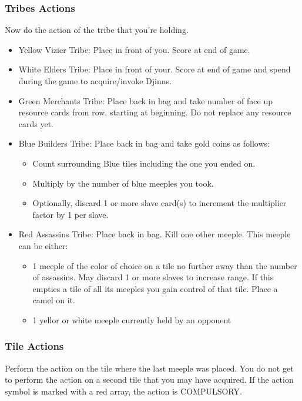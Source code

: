 \documentclass[12pt]{article}
\newenvironment{itemizeCustom}
{\begin{itemize}
  \setlength{\itemsep}{1pt}
  \setlength{\parskip}{0pt}
  \setlength{\parsep}{0pt}}
{\end{itemize}}
\begin{document}
\begin{multicols*}{2}
\subsubsection*{Tribes Actions}
Now do the action of the tribe that you're holding.
\begin{itemizeCustom}
    \item Yellow Vizier Tribe: Place in front of you. Score at end of game.
    \item White Elders Tribe: Place in front of your. Score at end of game and spend during the game to acquire/invoke Djinns.
    \item Green Merchants Tribe: Place back in bag and take number of face up resource cards from row, starting at beginning. Do not replace any resource cards yet.
    \item Blue Builders Tribe: Place back in bag and take gold coins as follows:
        \begin{itemizeCustom}
            \item Count surrounding Blue tiles including the one you ended on.
            \item Multiply by the number of blue meeples you took.
            \item Optionally, discard 1 or more slave card(s) to increment the multiplier factor by 1 per slave.
        \end{itemizeCustom}
    \item Red Assassins Tribe: Place back in bag. Kill one other meeple. This meeple can be either:
        \begin{itemizeCustom}
            \item 1 meeple of the color of choice on a tile no further away than the number of assassins. May discard 1 or more slaves to increase range. If this empties a tile of all its meeples you gain control of that tile. Place a camel on it.
            \item 1 yellor or white meeple currently held by an opponent
        \end{itemizeCustom}
\end{itemizeCustom}

\subsubsection*{Tile Actions}
Perform the action on the tile where the last meeple was placed. You do not get to perform the action on a second tile that you may have acquired. If the action symbol is marked with a red array, the action is COMPULSORY.


\end{multicols*}
\end{document}
